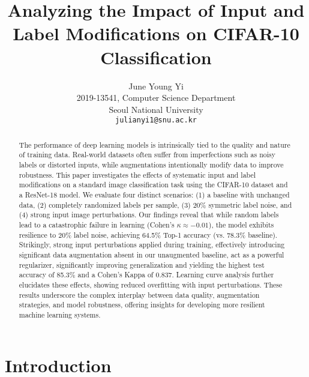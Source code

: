 \documentclass[10pt,twocolumn,letterpaper]{article}
\begin{document}
\title{Analyzing the Impact of Input and Label Modifications on CIFAR-10 Classification}

\author{June Young Yi\\ %
2019-13541, Computer Science Department\\
Seoul National University\\ %
{\tt\small julianyi1@snu.ac.kr} %
}

\maketitle

\begin{abstract}
    The performance of deep learning models is intrinsically tied to the quality and nature of training data. Real-world datasets often suffer from imperfections such as noisy labels or distorted inputs, while augmentations intentionally modify data to improve robustness. This paper investigates the effects of systematic input and label modifications on a standard image classification task using the CIFAR-10 dataset and a ResNet-18 model. We evaluate four distinct scenarios: (1) a baseline with unchanged data, (2) completely randomized labels per sample, (3) 20\% symmetric label noise, and (4) strong input image perturbations. Our findings reveal that while random labels lead to a catastrophic failure in learning (Cohen's $\kappa \approx -0.01$), the model exhibits resilience to 20\% label noise, achieving 64.5\% Top-1 accuracy (vs. 78.3\% baseline). Strikingly, strong input perturbations applied during training, effectively introducing significant data augmentation absent in our unaugmented baseline, act as a powerful regularizer, significantly improving generalization and yielding the highest test accuracy of 85.3\% and a Cohen's Kappa of 0.837. Learning curve analysis further elucidates these effects, showing reduced overfitting with input perturbations. These results underscore the complex interplay between data quality, augmentation strategies, and model robustness, offering insights for developing more resilient machine learning systems.
\end{abstract}

\section{Introduction}
\label{sec:intro}
\end{document}
